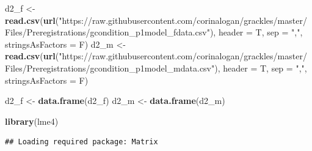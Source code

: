 \documentclass[
]{article}
\newenvironment{Shaded}{\begin{snugshade}}{\end{snugshade}}
\newcommand{\DataTypeTok}[1]{\textcolor[rgb]{0.13,0.29,0.53}{#1}}
\newcommand{\KeywordTok}[1]{\textcolor[rgb]{0.13,0.29,0.53}{\textbf{#1}}}
\newcommand{\NormalTok}[1]{#1}
\newcommand{\StringTok}[1]{\textcolor[rgb]{0.31,0.60,0.02}{#1}}
\begin{document}
\begin{Shaded}
\begin{Highlighting}[]
\NormalTok{d2_f <-}\StringTok{ }\KeywordTok{read.csv}\NormalTok{(}\KeywordTok{url}\NormalTok{(}\StringTok{"https://raw.githubusercontent.com/corinalogan/grackles/master/Files/Preregistrations/gcondition_p1model_fdata.csv"}\NormalTok{), }
    \DataTypeTok{header =}\NormalTok{ T, }\DataTypeTok{sep =} \StringTok{","}\NormalTok{, }\DataTypeTok{stringsAsFactors =}\NormalTok{ F)}
\NormalTok{d2_m <-}\StringTok{ }\KeywordTok{read.csv}\NormalTok{(}\KeywordTok{url}\NormalTok{(}\StringTok{"https://raw.githubusercontent.com/corinalogan/grackles/master/Files/Preregistrations/gcondition_p1model_mdata.csv"}\NormalTok{), }
    \DataTypeTok{header =}\NormalTok{ T, }\DataTypeTok{sep =} \StringTok{","}\NormalTok{, }\DataTypeTok{stringsAsFactors =}\NormalTok{ F)}

\NormalTok{d2_f <-}\StringTok{ }\KeywordTok{data.frame}\NormalTok{(d2_f)}
\NormalTok{d2_m <-}\StringTok{ }\KeywordTok{data.frame}\NormalTok{(d2_m)}

\KeywordTok{library}\NormalTok{(lme4)}
\end{Highlighting}
\end{Shaded}

\begin{verbatim}
## Loading required package: Matrix
\end{verbatim}
\end{document}
